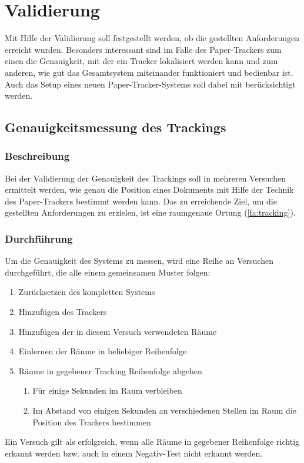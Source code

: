 \chapter{Validierung}
Mit Hilfe der Validierung soll festgestellt werden, ob die gestellten Anforderungen erreicht wurden.
Besonders interessant sind im Falle des Paper-Trackers zum einen die Genauigkeit, mit der ein Tracker lokalisiert werden
kann und zum anderen, wie gut das Gesamtsystem miteinander funktioniert und bedienbar ist.
Auch das Setup eines neuen Paper-Tracker-Systems soll dabei mit berücksichtigt werden.

\section{Genauigkeitsmessung des Trackings}

\subsection{Beschreibung}
Bei der Validierung der Genauigkeit des Trackings soll in mehreren Versuchen ermittelt werden, wie genau die Position
eines Dokuments mit Hilfe der Technik des Paper-Trackers bestimmt werden kann.
Das zu erreichende Ziel, um die gestellten Anforderungen zu erzielen, ist eine raumgenaue Ortung (\ref*{fa:tracking}).

\subsection{Durchführung}
Um die Genauigkeit des Systems zu messen, wird eine Reihe an Versuchen durchgeführt, die alle einem gemeinsamen Muster folgen:
\begin{enumerate}
	\item Zurücksetzen des kompletten Systems
	\item Hinzufügen des Trackers
	\item Hinzufügen der in diesem Versuch verwendeten Räume
	\item Einlernen der Räume in beliebiger Reihenfolge
	\item Räume in gegebener Tracking Reihenfolge abgehen
	\begin{enumerate}
		\item Für einige Sekunden im Raum verbleiben
		\item Im Abstand von einigen Sekunden an verschiedenen Stellen im Raum die Position des Trackers bestimmen
	\end{enumerate}
\end{enumerate}
Ein Versuch gilt als erfolgreich, wenn alle Räume in gegebener Reihenfolge richtig erkannt werden bzw. auch in einem
Negativ-Test nicht erkannt werden.

